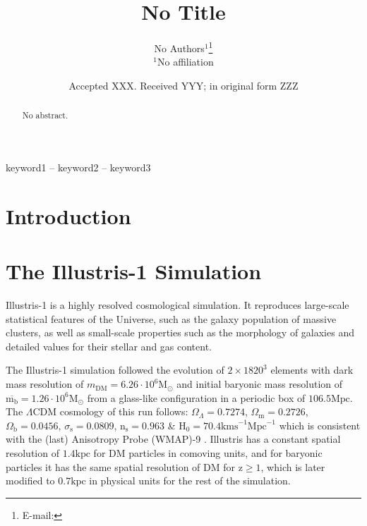 \documentclass[a4paper,fleqn,usenatbib]{mnras}
\title[No Title]{No Title}
\author[No Author et al.]{
No Authors$^{1}$\thanks{E-mail: }\\
$^{1}$No affiliation\\
}
\date{Accepted XXX. Received YYY; in original form ZZZ}
\begin{document}
\label{firstpage}
\pagerange{\pageref{firstpage}--\pageref{lastpage}}
\maketitle

\begin{abstract}
No abstract.
\end{abstract}

\begin{keywords}
keyword1 -- keyword2 -- keyword3
\end{keywords}



\section{Introduction}

\section{The Illustris-1 Simulation}
Illustris-1 is a highly resolved cosmological simulation. 
It reproduces large-scale statistical features of the Universe, such
as the galaxy population of massive clusters, as well as small-scale
properties such as the morphology of galaxies and detailed values for
their stellar and gas content.  

The Illustris-1 simulation followed  the evolution of $2 \times 1820^3$
elements with dark mass resolution of $m_{\text{DM}} = 6.26\cdot
10^6\text{M}_{\odot}$ and initial baryonic mass resolution of
$\overline{\text{m}_\text{b}}=1.26\cdot 10^6\text{M}_{\odot}$ from a
glass-like configuration in a periodic box of $106.5\text{Mpc}$. The
$\Lambda \text{CDM}$ cosmology of this run follows:
$\Omega_\Lambda=0.7274$, $\Omega_\text{m}=0.2726$,
$\Omega_\text{b}=0.0456$, $\sigma_\text{s}=0.0809$,
$\text{n}_\text{s}=0.963$ \& $\text{H}_0=70.4\text{kms} 
^{-1}\text{Mpc}^{-1}$ which is consistent with the (last) Anisotropy
Probe (WMAP)-9 \cite{AnisotropyProbe}. Illustris has a constant
spatial resolution of $1.4\text{kpc}$ for DM particles in comoving
units, and for baryonic particles it has the same spatial resolution
of DM for $\text{z}\geq 1$, which is later modified to $0.7\text{kpc}$
in physical units for the rest of the simulation. \\ 
\end{document}
